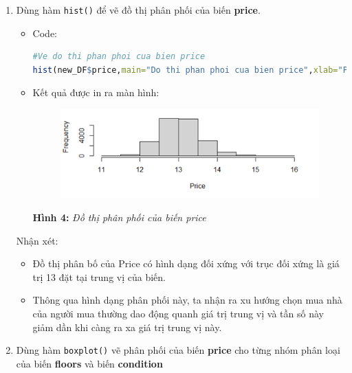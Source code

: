 \documentclass[a4paper]{article}
\theoremstyle{definition}
\begin{document}
\begin{itemize}
\begin{enumerate}
\begin{enumerate}
        \item Dùng hàm \texttt{hist()} để vẽ đồ thị phân phối của biến \textbf{price}.
        
        \begin{itemize}
            \item Code:
            
            \begin{lstlisting}[language=R, caption=Code for question 3d]
#Ve do thi phan phoi cua bien price            
hist(new_DF$price,main="Do thi phan phoi cua bien price",xlab="Price")
            \end{lstlisting}
            
            \item Kết quả được in ra màn hình:
            
            \begin{figure}[H]
            \centering
            \includegraphics[scale=0.7]{3d.png}
            \label{fig:my_label}
        \end{figure} 
        
        \begin{center}
            \textbf{Hình 4: }\textit{Đồ thị phân phối của biến price}
        \end{center}
            
        \end{itemize}
        Nhận xét:\\
        \begin{itemize}
            \item Đồ thị phân bố của Price có hình dạng đối xứng với trục đối xứng là giá trị 13 đặt tại trung vị của biến.
            \item Thông qua hình dạng phân phối này, ta nhận ra xu hướng chọn mua nhà của người mua thường dao động quanh giá trị trung vị và tần số này giảm dần khi càng ra xa giá trị trung vị này.
        \end{itemize}
        \item Dùng hàm \texttt{boxplot()} vẽ phân phối của biến \textbf{price} cho từng nhóm phân loại của biến \textbf{floors} và biến \textbf{condition}
        

\end{enumerate}
\end{enumerate}
\end{itemize}
\end{document}
